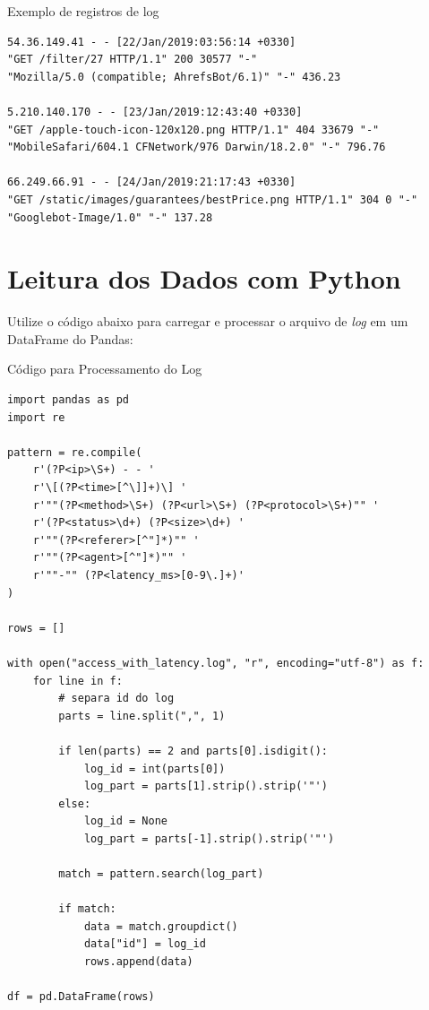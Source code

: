 \documentclass[12pt]{article}
\begin{document}
\begin{block}{Exemplo de registros de log}

\small

\begin{verbatim}
54.36.149.41 - - [22/Jan/2019:03:56:14 +0330] 
"GET /filter/27 HTTP/1.1" 200 30577 "-" 
"Mozilla/5.0 (compatible; AhrefsBot/6.1)" "-" 436.23

5.210.140.170 - - [23/Jan/2019:12:43:40 +0330] 
"GET /apple-touch-icon-120x120.png HTTP/1.1" 404 33679 "-" 
"MobileSafari/604.1 CFNetwork/976 Darwin/18.2.0" "-" 796.76

66.249.66.91 - - [24/Jan/2019:21:17:43 +0330] 
"GET /static/images/guarantees/bestPrice.png HTTP/1.1" 304 0 "-" 
"Googlebot-Image/1.0" "-" 137.28
\end{verbatim}

\end{block}

\section*{Leitura dos Dados com Python}

Utilize o código abaixo para carregar e processar o arquivo de \textit{log} em um DataFrame do Pandas:

\begin{block}{Código para Processamento do Log}
\small
\begin{verbatim}
import pandas as pd
import re

pattern = re.compile(
    r'(?P<ip>\S+) - - '
    r'\[(?P<time>[^\]]+)\] '
    r'""(?P<method>\S+) (?P<url>\S+) (?P<protocol>\S+)"" '
    r'(?P<status>\d+) (?P<size>\d+) '
    r'""(?P<referer>[^"]*)"" '
    r'""(?P<agent>[^"]*)"" '
    r'""-"" (?P<latency_ms>[0-9\.]+)'
)

rows = []

with open("access_with_latency.log", "r", encoding="utf-8") as f:
    for line in f:
        # separa id do log
        parts = line.split(",", 1)

        if len(parts) == 2 and parts[0].isdigit():
            log_id = int(parts[0])
            log_part = parts[1].strip().strip('"')
        else:
            log_id = None
            log_part = parts[-1].strip().strip('"')

        match = pattern.search(log_part)

        if match:
            data = match.groupdict()
            data["id"] = log_id
            rows.append(data)

df = pd.DataFrame(rows)
\end{verbatim}
\end{block}
\end{document}
